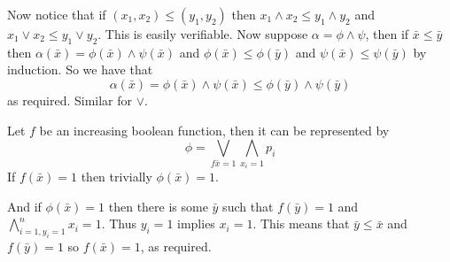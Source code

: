 Now notice that if $(x_1,x_2)\leq(y_1,y_2)$ then $x_1\land x_2\leq y_1\land y_2$ and $x_1\lor x_2\leq y_1\lor y_2$.
This is easily verifiable.
Now suppose $\alpha=\phi\land\psi$, then if $\bar x\leq\bar y$ then $\alpha(\bar x)=\phi(\bar x)\land\psi(\bar x)$ and $\phi(\bar x)\leq\phi(\bar y)$ and $\psi(\bar x)\leq\psi(\bar y)$ by induction.
So we have that
$$ \alpha(\bar x) = \phi(\bar x)\land\psi(\bar x) \leq \phi(\bar y)\land\psi(\bar y) $$
as required.
Similar for $\lor$.

Let $f$ be an increasing boolean function, then it can be represented by
$$ \phi = \bigvee_{f\bar x=1}\bigwedge_{x_i=1}p_i $$
If $f(\bar x)=1$ then trivially $\phi(\bar x)=1$.

And if $\phi(\bar x)=1$ then there is some $\bar y$ such that $f(\bar y)=1$ and
$\bigwedge_{i=1,y_i=1}^nx_i=1$.
Thus $y_i=1$ implies $x_i=1$.
This means that $\bar y\leq\bar x$ and $f(\bar y)=1$ so $f(\bar x)=1$, as required.

\bye

